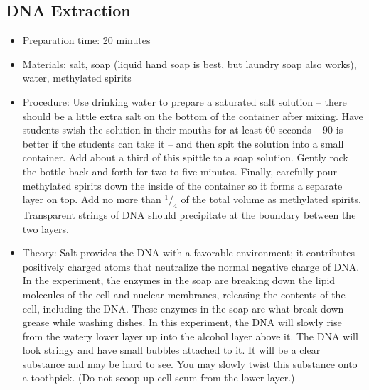 \subsection{DNA Extraction}
\begin{itemize}
\item{Preparation time: 20 minutes}
\item{Materials: salt, soap (liquid hand soap is best, but laundry soap also works), water, methylated spirits}
\item{Procedure: Use drinking water to prepare a saturated salt solution -- there should be a little extra salt on the bottom of the container after mixing. Have students swish the solution in their mouths for at least 60 seconds -- 90 is better if the students can take it -- and then spit the solution into a small container. Add about a third of this spittle to a soap solution. Gently rock the bottle back and forth for two to five minutes. Finally, carefully pour methylated spirits down the inside of the container so it forms a separate layer on top. Add no more than $^1/_4$ of the total volume as methylated spirits. Transparent strings of DNA should precipitate at the boundary between the two layers.}
\item{Theory: Salt provides the DNA with a favorable environment; it contributes positively charged atoms that neutralize the normal negative charge of DNA. In the experiment, the enzymes in the soap are breaking down the lipid molecules of the cell and nuclear membranes, releasing the contents of the cell, including the DNA. These enzymes in the soap are what break down grease while washing dishes. In this experiment, the DNA will slowly rise from the watery lower layer up into the alcohol layer above it. The DNA will look stringy and have small bubbles attached to it. It will be a clear substance and may be hard to see. You may slowly twist this substance onto a toothpick. (Do not scoop up cell scum from the lower layer.)}
\end{itemize}


